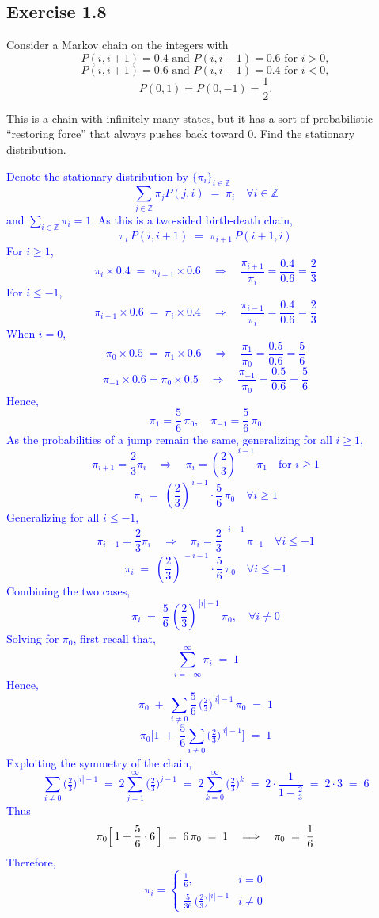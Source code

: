 \documentclass{article}
\begin{document}
    \subsection*{Exercise 1.8} Consider a Markov chain on the integers with
\[
P(i, i+1) = 0.4 \text{ and } P(i, i-1) = 0.6 \text{ for } i > 0,
\]
\[
P(i, i+1) = 0.6 \text{ and } P(i, i-1) = 0.4 \text{ for } i < 0,
\]
\[
P(0,1) = P(0,-1) = \frac{1}{2}.
\]

This is a chain with infinitely many states, but it has a sort of probabilistic ``restoring force'' that always pushes back toward 0. Find the stationary distribution.

\textcolor{blue}{
Denote the stationary distribution by $\{\pi_i\}_{i\in\mathbb{Z}}$
\[
\sum_{j \in \mathbb{Z}} \pi_j P(j,i) \;=\; \pi_i
\quad \forall i \in \mathbb{Z}
\]
and $\sum_{i \in \mathbb{Z}} \pi_i = 1$.
As this is a two-sided birth-death chain,
\[
\pi_i \, P(i, i+1) \;=\; \pi_{i+1} \, P(i+1, i)
\]
For $i \ge 1$,
\[
\pi_i \times 0.4 \;=\; \pi_{i+1} \times 0.6
\quad \Longrightarrow \quad 
\frac{\pi_{i+1}}{\pi_i} = \frac{0.4}{0.6} = \frac{2}{3}
\]
For $i \le -1$,
\[
    \pi_{i-1} \times 0.6 \;=\; \pi_{i} \times 0.4
\quad \Longrightarrow \quad 
\frac{\pi_{i-1}}{\pi_i} = \frac{0.4}{0.6} = \frac{2}{3}
\]
When $i=0$,
\[
\pi_0 \times 0.5 \;=\; \pi_1 \times 0.6
\quad \Longrightarrow \quad
\frac{\pi_1}{\pi_0} = \frac{0.5}{0.6} = \frac{5}{6}
\]
\[
\pi_{-1} \times 0.6 = \pi_0 \times 0.5
\quad \Longrightarrow \quad 
\frac{\pi_{-1}}{\pi_{0}} = \frac{0.5}{0.6} = \frac{5}{6}
\]
Hence,
\[
\pi_1 = \frac{5}{6}\,\pi_0, 
\quad
\pi_{-1} = \frac{5}{6}\,\pi_0
\]
As the probabilities of a jump remain the same, generalizing for all $i\geq1$,
\[
\pi_{i+1} = \frac{2}{3} \pi_{i}
\quad\Longrightarrow\quad 
\pi_i = \left(\frac{2}{3}\right)^{\,i-1} \,\pi_1
\quad \text{for } i \ge 1
\]
\[
\pi_i 
\;=\; 
\left(\frac{2}{3}\right)^{\,i-1} \cdot \frac{5}{6}\,\pi_0
\quad \forall i \ge 1
\]
Generalizing for all $i\leq-1$,
\[
    \pi_{i-1} = \frac{2}{3} \pi_{i}
\quad\Longrightarrow\quad
\pi_{i} = \frac{2}{3}^{-i-1}\,\pi_{-1}
\quad \forall i\leq -1
\]
\[
    \pi_{i} 
\;=\; 
\left(\frac{2}{3}\right)^{\,-i-1} \cdot \frac{5}{6}\,\pi_0
\quad \forall i \leq -1
\]
Combining the two cases,
\[
\pi_i 
\;=\;
\frac{5}{6}\,\left(\frac{2}{3}\right)^{\,|i|-1}\,\pi_0, \quad \forall i \neq 0
\]
Solving for $\pi_0$, first recall that,
\[
\sum_{i=-\infty}^{\infty} \pi_i \;=\; 1
\]
Hence,
\[
\pi_0 
\;+\;
\sum_{i\neq 0} \frac{5}{6} \,\biggl(\tfrac{2}{3}\biggr)^{|i|-1}\,\pi_0
\;=\; 1
\]
\[
\pi_0 
\biggl[
1 
\;+\; 
\frac{5}{6}\sum_{i\neq 0}\bigl(\tfrac{2}{3}\bigr)^{|i|-1}
\biggr]
\;=\; 1
\]
Exploiting the symmetry of the chain,
\[
\sum_{i\neq 0}\bigl(\tfrac{2}{3}\bigr)^{|i|-1} 
\;=\;
2 \sum_{j=1}^{\infty} \bigl(\tfrac{2}{3}\bigr)^{j-1}
\;=\;
2 \sum_{k=0}^{\infty} \bigl(\tfrac{2}{3}\bigr)^{k}
\;=\;
2 \cdot \frac{1}{1 - \tfrac{2}{3}}
\;=\;
2 \cdot 3
\;=\;
6
\]
Thus
\[
\pi_0 \Bigl[\,1 + \frac56 \cdot 6\,\Bigr] 
\;=\;
6\,\pi_0
\;=\;
1 
\quad\Longrightarrow\quad
\pi_0 
\;=\; 
\frac{1}{6}
\]
Therefore,
\[
\pi_i
=
\begin{cases}
\displaystyle \frac{1}{6},
& i=0\\[6pt]
\displaystyle \frac{5}{36}\,\bigl(\tfrac{2}{3}\bigr)^{|i|-1}
& i \neq 0
\end{cases}
\]
}
\end{document}
